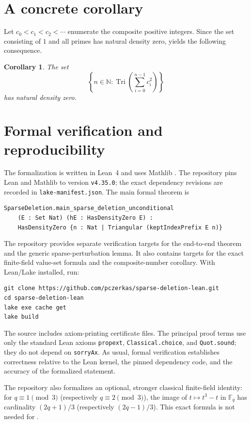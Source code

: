 \documentclass[11pt]{article}
\newtheorem{corollary}[theorem]{Corollary}
\theoremstyle{definition}
\theoremstyle{remark}
\newcommand{\N}{\mathbb{N}}
\newcommand{\FF}{\mathbb{F}}
\newcommand{\Tri}{\operatorname{Tri}}
\begin{document}
\section{A concrete corollary}

Let $c_0<c_1<c_2<\cdots$ enumerate the composite positive integers.  Since
the set consisting of $1$ and all primes has natural density zero,
 yields the following consequence.

\begin{corollary}
The set
\[
  \left\{n\in\N:
    \Tri\!\left(\sum_{i=0}^{n-1}c_i^2\right)\right\}
\]
has natural density zero.
\end{corollary}

\section{Formal verification and reproducibility}

The formalization is written in Lean~4 \cite{lean4} and uses Mathlib
\cite{mathlib}.  The repository pins
Lean and Mathlib to version \texttt{v4.35.0}; the exact dependency revisions are
recorded in \texttt{lake-manifest.json}.  The main formal theorem is
\begin{verbatim}
SparseDeletion.main_sparse_deletion_unconditional
    (E : Set Nat) (hE : HasDensityZero E) :
    HasDensityZero {n : Nat | Triangular (keptIndexPrefix E n)}
\end{verbatim}

The repository provides separate verification targets for the end-to-end
theorem and the generic sparse-perturbation lemma.  It also contains targets
for the exact finite-field value-set formula and the composite-number
corollary.  With Lean/Lake installed, run:
\begin{verbatim}
git clone https://github.com/pczerkas/sparse-deletion-lean.git
cd sparse-deletion-lean
lake exe cache get
lake build
\end{verbatim}
The source includes axiom-printing certificate files.  The principal proof
terms use only the standard Lean axioms \texttt{propext},
\texttt{Classical.choice}, and \texttt{Quot.sound}; they do not depend on
\texttt{sorryAx}.  As usual, formal verification establishes correctness
relative to the Lean kernel, the pinned dependency code, and the accuracy of
the formalized statement.

The repository also formalizes an optional, stronger classical finite-field
identity: for $q\equiv1\pmod3$ (respectively $q\equiv2\pmod3$), the image of
$t\mapsto t^3-t$ in $\FF_q$ has cardinality $(2q+1)/3$ (respectively
$(2q-1)/3$).  This exact formula is not needed for .
\end{document}
